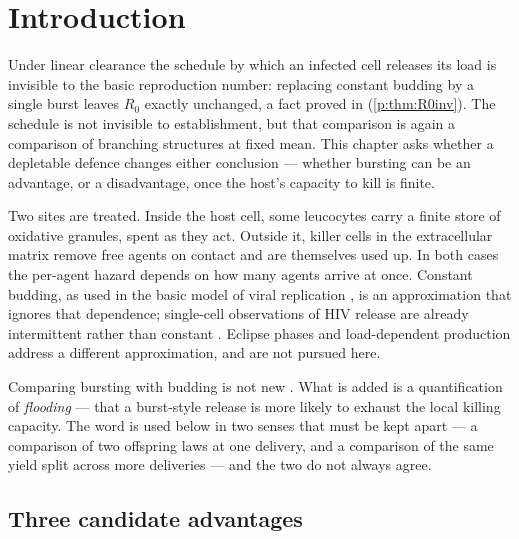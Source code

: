 
\section{Introduction}
\label{path:sec:introduction}

Under linear clearance the schedule by which an infected cell releases its
load is invisible to the basic reproduction number: replacing constant
budding by a single burst leaves $R_0$ exactly unchanged, a fact proved in
\ChPop{} (\cref{p:thm:R0inv}). The schedule is not invisible to
establishment, but that comparison is again a comparison of branching
structures at fixed mean. This chapter asks whether a depletable defence
changes either conclusion --- whether bursting can be an advantage, or a
disadvantage, once the host's capacity to kill is finite.

Two sites are treated. Inside the host cell, some leucocytes carry a finite
store of oxidative granules, spent as they act. Outside it, killer cells in
the extracellular matrix remove free agents on contact and are themselves
used up. In both cases the per-agent hazard depends on how many agents
arrive at once. Constant budding, as used in the basic model of viral
replication \cite{anderson1988role,perelson1996hiv,nowak1996population}, is
an approximation that ignores that dependence; single-cell observations of
HIV release are already intermittent rather than constant
\cite{ribeiro2010estimation,capistran2018extracellular,ciupe2017host}.
Eclipse phases and load-dependent production
\cite{nelson2004age,kitagawa2018pde,rong2013analysis} address a different
approximation, and are not pursued here.

Comparing bursting with budding is not new
\cite{pearson2011stochastic,komarova2007viral,bird2015escape,bird2015nonlytic,garoff1998virus}.
What is added is a quantification of \emph{flooding} --- that a burst-style
release is more likely to exhaust the local killing capacity. The word is
used below in two senses that must be kept apart --- a comparison of two
offspring laws at one delivery, and a comparison of the same yield split
across more deliveries --- and the two do not always agree.

\subsection{Three candidate advantages}
\label{path:sec:advantages}

